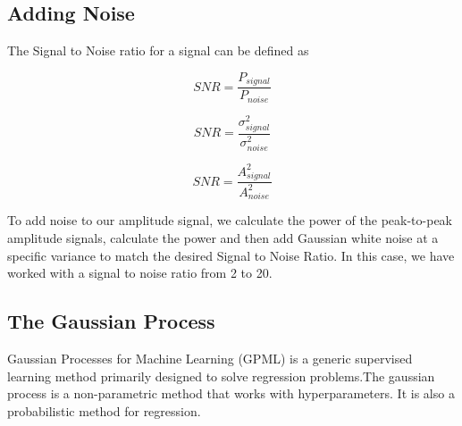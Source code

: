 \subsection{Adding Noise}
The Signal to Noise ratio for a signal can be defined as 

\begin{equation}
SNR = \frac{P_{signal}}{P_{noise}}
\end{equation}

\begin{equation}
SNR = \frac{\sigma^2_{signal}}{\sigma^2_{noise}}
\end{equation}

\begin{equation}
SNR = \frac{A^2_{signal}}{A^2_{noise}}
\end{equation}

To add noise to our amplitude signal, we calculate the power of the peak-to-peak amplitude signals, calculate the power and then add Gaussian white noise at a specific variance to match the desired Signal to Noise Ratio. In this case, we have worked with a signal to noise ratio from 2 to 20.
\subsection{The Gaussian Process}
Gaussian Processes for Machine Learning (GPML) is a generic supervised learning method primarily designed to solve regression problems.The gaussian process is a non-parametric method that works with hyperparameters. It is also a probabilistic method for regression.

